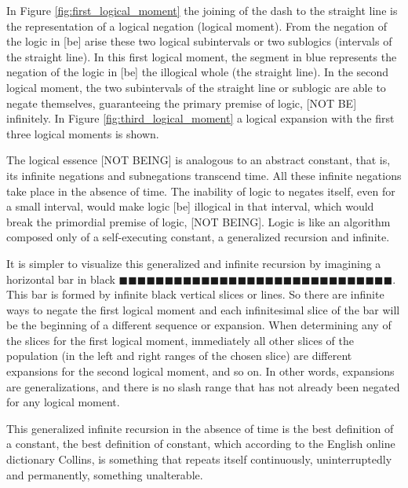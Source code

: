 In Figure \ref{fig:first_logical_moment} the joining of the dash to the straight line is the representation of a logical negation (logical moment). From the negation of the logic in [be] arise these two logical subintervals or two sublogics (intervals of the straight line). In this first logical moment, the segment in blue represents the negation of the logic in [be] the illogical whole (the straight line). In the second logical moment, the two subintervals of the straight line or sublogic are able to negate themselves, guaranteeing the primary premise of logic, [NOT BE] infinitely. In Figure \ref{fig:third_logical_moment} a logical expansion with the first three logical moments is shown.

The logical essence [NOT BEING] is analogous to an abstract constant, that is, its infinite negations and subnegations transcend time. All these infinite negations take place in the absence of time. The inability of logic to negates itself, even for a small interval, would make logic [be] illogical in that interval, which would break the primordial premise of logic, [NOT BEING]. Logic is like an algorithm composed only of a self-executing constant, a generalized recursion and infinite.

It is simpler to visualize this generalized and infinite recursion by imagining a horizontal bar in black $\!\blacksquare\!\blacksquare\!\blacksquare\!\blacksquare\!\blacksquare\!\blacksquare\!\blacksquare\!\blacksquare\!\blacksquare\!\blacksquare\!\blacksquare\!\blacksquare\!\blacksquare\!\blacksquare\!\blacksquare\!\blacksquare\!\blacksquare\!\blacksquare\!\blacksquare\!\blacksquare\!\blacksquare\!\blacksquare\!\blacksquare\!\blacksquare\!\blacksquare\!\blacksquare\!\blacksquare\!\blacksquare\!\blacksquare\!\blacksquare$. This bar is formed by infinite black vertical slices or lines. So there are infinite ways to negate the first logical moment and each infinitesimal slice of the bar will be the beginning of a different sequence or expansion. When determining any of the slices for the first logical moment, immediately all other slices of the population (in the left and right ranges of the chosen slice) are different expansions for the second logical moment, and so on. In other words, expansions are generalizations, and there is no slash range that has not already been negated for any logical moment.

This generalized infinite recursion in the absence of time is the best definition of a constant, the best definition of constant, which according to the English online dictionary Collins\cite{dic_constant}, is something that repeats itself continuously, uninterruptedly and permanently, something unalterable.

